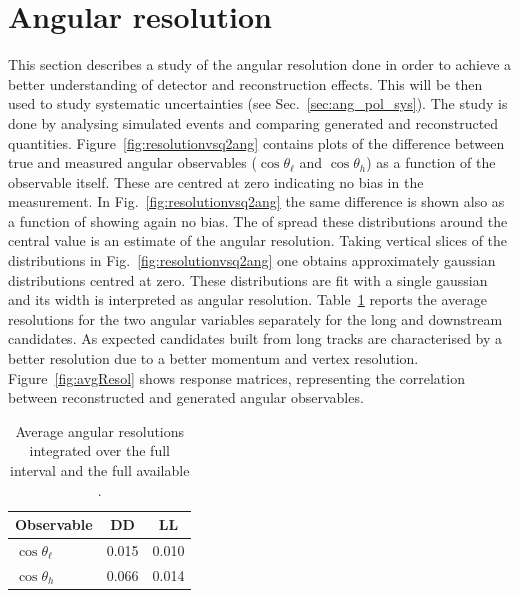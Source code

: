 \section{Angular resolution}
\label{sec:and_resolution}

This section describes a study of the angular resolution done in order to achieve a better understanding
of detector and reconstruction effects. This will be then used to study systematic uncertainties (see Sec.~\ref{sec:ang_pol_sys}).
The study is done by analysing simulated events and comparing generated and reconstructed quantities.
Figure~\ref{fig:resolutionvsq2ang} contains plots of the difference between true and measured angular observables 
($\cos \theta_\ell$ and $\cos \theta_h$) as a function of the observable itself.
These are centred at zero indicating no bias in the measurement.
In Fig.~\ref{fig:resolutionvsq2ang} the same difference is shown also as a function of \qsq showing again no bias.
The of spread these distributions around the central value is an estimate of the angular resolution.
Taking vertical slices of the distributions in Fig.~\ref{fig:resolutionvsq2ang} one obtains approximately gaussian
distributions centred at zero. These distributions are fit with a single gaussian and its width
is interpreted as angular resolution. Table~\ref{tab:resolutions} reports the average resolutions
for the two angular variables separately for the long and downstream candidates. As expected candidates built
from long tracks are characterised by a better resolution due to a better momentum and vertex resolution.
Figure~\ref{fig:avgResol} shows response matrices, representing the correlation between 
reconstructed and generated angular observables.
%
\begin{table}[h]
\centering
\caption{Average angular resolutions integrated over the full interval and the full available \qsq.}
\begin{tabular}{l|cc}
Observable      & DD & LL     \\ \hline
$\cos \theta_\ell$ & 0.015 & 0.010 \\
$\cos \theta_h$ & 0.066 & 0.014 \\
\end{tabular}
\label{tab:resolutions}
\end{table}


